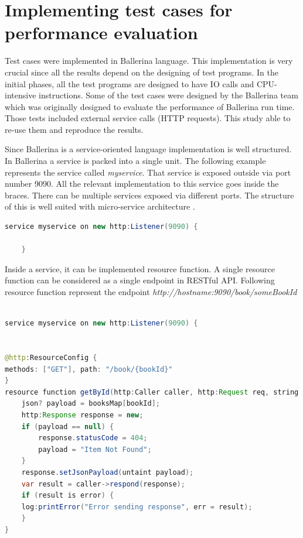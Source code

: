 \section{Implementing test cases for performance evaluation}

Test cases were implemented in Ballerina language. This implementation is very crucial since all the results depend on the designing of test programs. In the initial phases, all the test programs are designed to have IO calls and CPU-intensive instructions. Some of the test cases were designed by the Ballerina team \cite{Ballerina_Performance} which was originally designed to evaluate the performance of Ballerina run time. Those tests included external service calls (HTTP requests). This study able to re-use them and reproduce the results.

Since Ballerina is a service-oriented language implementation is well structured. In Ballerina a service is packed into a single unit. The following example represents the service called \textit{myservice}. That service is exposed outside via port number 9090. All the relevant implementation to this service goes inside the braces. There can be multiple services exposed via different ports. The structure of this is well suited with micro-service architecture \cite{nadareishvili2016microservice}.


\begin{lstlisting}[language=Java]
 service myservice on new http:Listener(9090) {
	
	}

\end{lstlisting}

Inside a service, it can be implemented resource function. A single resource function can be considered as a single endpoint in RESTful API. Following resource function represent the endpoint \textit{http://hostname:9090/book/someBookId}

\begin{lstlisting}[language=Java]

service myservice on new http:Listener(9090) {


@http:ResourceConfig {
methods: ["GET"], path: "/book/{bookId}"
}
resource function getById(http:Caller caller, http:Request req, string bookId) {
	json? payload = booksMap[bookId];
	http:Response response = new;
	if (payload == null) {
		response.statusCode = 404;
		payload = "Item Not Found";
	}
	response.setJsonPayload(untaint payload);
	var result = caller->respond(response);
	if (result is error) {
	log:printError("Error sending response", err = result);
	}
}

\end{lstlisting}

